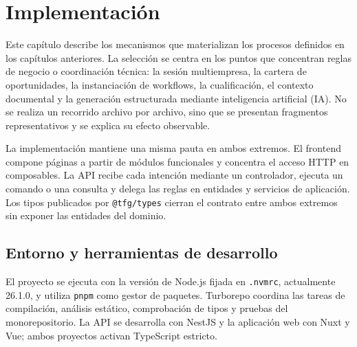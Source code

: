 \chapter{Implementación}
\label{chap:implementation}

Este capítulo describe los mecanismos que materializan los procesos definidos
en los capítulos anteriores. La selección se centra en los puntos que
concentran reglas de negocio o coordinación técnica: la sesión multiempresa,
la cartera de oportunidades, la instanciación de workflows, la cualificación,
el contexto documental y la generación estructurada mediante inteligencia
artificial (IA). No se realiza un recorrido archivo por archivo, sino que se
presentan fragmentos representativos y se explica su efecto observable.

La implementación mantiene una misma pauta en ambos extremos. El frontend
compone páginas a partir de módulos funcionales y concentra el acceso HTTP en
composables. La API recibe cada intención mediante un controlador, ejecuta un
comando o una consulta y delega las reglas en entidades y servicios de
aplicación. Los tipos publicados por \texttt{@tfg/types} cierran el contrato
entre ambos extremos sin exponer las entidades del dominio.

\section{Entorno y herramientas de desarrollo}

El proyecto se ejecuta con la versión de Node.js fijada en
\texttt{.nvmrc}, actualmente 26.1.0, y utiliza \texttt{pnpm} como gestor de
paquetes. Turborepo coordina las tareas de compilación, análisis estático,
comprobación de tipos y pruebas del monorepositorio. La API se desarrolla con
NestJS y la aplicación web con Nuxt y Vue; ambos proyectos activan TypeScript
estricto.

